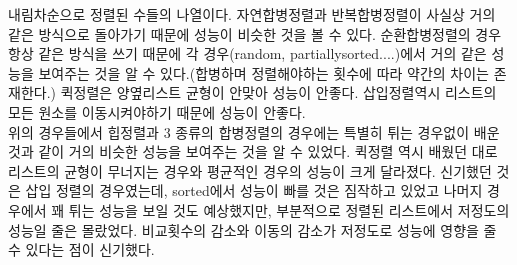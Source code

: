 \documentclass[a4paper,11pt]{article}
\begin{document}
 내림차순으로 정렬된 수들의 나열이다. 자연합병정렬과 반복합병정렬이 사실상 거의 같은 방식으로 돌아가기 때문에 성능이 비슷한 것을 볼 수 있다. 순환합병정렬의 경우 항상 같은 방식을 쓰기 때문에 각 경우(random, partiallysorted....)에서 거의 같은 성능을 보여주는 것을 알 수 있다.(합병하며 정렬해야하는 횟수에 따라 약간의 차이는 존재한다.) 퀵정렬은 양옆리스트 균형이 안맞아 성능이 안좋다. 삽입정렬역시 리스트의 모든 원소를 이동시켜야하기 때문에 성능이 안좋다. \\
 
위의 경우들에서 힙정렬과 3 종류의 합병정렬의 경우에는 특별히 튀는 경우없이 배운 것과 같이 거의 비슷한 성능을 보여주는 것을 알 수 있었다. 퀵정렬 역시 배웠던 대로 리스트의 균형이 무너지는 경우와 평균적인 경우의 성능이 크게 달라졌다. 신기했던 것은 삽입 정렬의 경우였는데, sorted에서 성능이 빠를 것은 짐작하고 있었고 나머지 경우에서 꽤 튀는 성능을 보일 것도 예상했지만, 부분적으로 정렬된 리스트에서 저정도의 성능일 줄은 몰랐었다. 비교횟수의 감소와 이동의 감소가 저정도로 성능에 영향을 줄 수 있다는 점이 신기했다.
\end{document}
